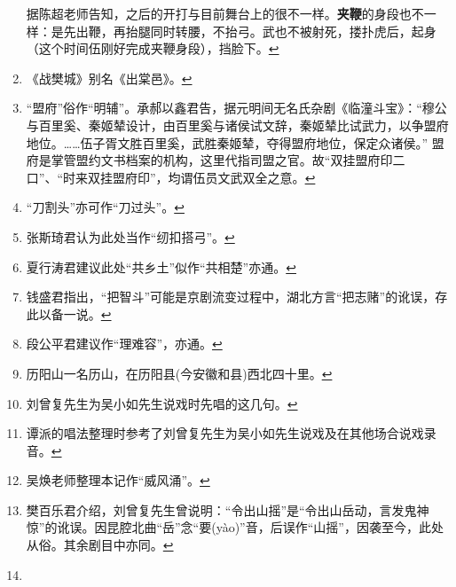 \begin{enumerate}
  据陈超老师告知，之后的开打与目前舞台上的很不一样。\textbf{夹鞭}的身段也不一样：是先出鞭，再抬腿同时转腰，不抬弓。武也不被射死，搂扑虎后，起身（这个时间伍刚好完成夹鞭身段），挡脸下。\protect\hyperlink{fnref59}{↩}
\item
  \leavevmode\hypertarget{fn60}{}%
  《战樊城》别名《出棠邑》。\protect\hyperlink{fnref60}{↩}
\item
  \leavevmode\hypertarget{fn61}{}%
  ``盟府''俗作``明辅''。承郝以鑫君告，据元明间无名氏杂剧《临潼斗宝》：``穆公与百里奚、秦姬辇设计，由百里奚与诸侯试文辞，秦姬辇比试武力，以争盟府地位。\ldots{}\ldots{}伍子胥文胜百里奚，武胜秦姬辇，夺得盟府地位，保定众诸侯。''
  盟府是掌管盟约文书档案的机构，这里代指司盟之官。故``双挂盟府印二口''、``时来双挂盟府印''，均谓伍员文武双全之意。\protect\hyperlink{fnref61}{↩}
\item
  \leavevmode\hypertarget{fn62}{}%
  ``刀割头''亦可作``刀过头''。\protect\hyperlink{fnref62}{↩}
\item
  \leavevmode\hypertarget{fn63}{}%
  张斯琦君认为此处当作``纫扣搭弓''。\protect\hyperlink{fnref63}{↩}
\item
  \leavevmode\hypertarget{fn64}{}%
  夏行涛君建议此处``共乡土''似作``共相楚''亦通。\protect\hyperlink{fnref64}{↩}
\item
  \leavevmode\hypertarget{fn65}{}%
  钱盛君指出，``把智斗''可能是京剧流变过程中，湖北方言``把志赌''的讹误，存此以备一说。\protect\hyperlink{fnref65}{↩}
\item
  \leavevmode\hypertarget{fn66}{}%
  段公平君建议作``理难容''，亦通。\protect\hyperlink{fnref66}{↩}
\item
  \leavevmode\hypertarget{fn67}{}%
  历阳山一名历山，在历阳县(今安徽和县)西北四十里。\protect\hyperlink{fnref67}{↩}
\item
  \leavevmode\hypertarget{fn68}{}%
  刘曾复先生为吴小如先生说戏时先唱的这几句。\protect\hyperlink{fnref68}{↩}
\item
  \leavevmode\hypertarget{fn69}{}%
  谭派的唱法整理时参考了刘曾复先生为吴小如先生说戏及在其他场合说戏录音。\protect\hyperlink{fnref69}{↩}
\item
  \leavevmode\hypertarget{fn70}{}%
  吴焕老师整理本记作``威风涌''。\protect\hyperlink{fnref70}{↩}
\item
  \leavevmode\hypertarget{fn71}{}%
  樊百乐君介绍，刘曾复先生曾说明：``令出山摇''是``令出山岳动，言发鬼神惊''的讹误。因昆腔北曲``岳''念``要(yào)''音，后误作``山摇''，因袭至今，此处从俗。其余剧目中亦同。\protect\hyperlink{fnref71}{↩}
\item
  \leavevmode\hypertarget{fn72}{}%

\end{enumerate}
